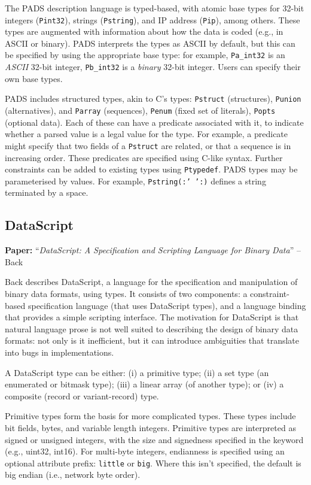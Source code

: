 \documentclass[10pt]{article}
\newcommand{\paper}[3]{\vspace{4mm}\noindent\textbf{Paper:} ``\textit{#1}'' -- #2 \cite{#3}\vspace{3mm}}
\begin{document}
The PADS description language is typed-based, with atomic base types for 32-bit integers
(\texttt{Pint32}), strings (\texttt{Pstring}), and IP address (\texttt{Pip}), among
others. These types are augmented with information about how the data is coded (e.g., in
ASCII or binary). PADS interprets the types as ASCII by default, but this can be specified
by using the appropriate base type: for example, \texttt{Pa\_int32} is an \emph{ASCII}
32-bit integer, \texttt{Pb\_int32} is a \emph{binary} 32-bit integer. Users can specify
their own base types.

PADS includes structured types, akin to C's types: \texttt{Pstruct} (structures),
\texttt{Punion} (alternatives), and \texttt{Parray} (sequences), \texttt{Penum} (fixed set
of literals), \texttt{Popts} (optional data). Each of these can have a predicate
associated with it, to indicate whether a parsed value is a legal value for the type. For
example, a predicate might specify that two fields of a \texttt{Pstruct} are related, or
that a sequence is in increasing order. These predicates are specified using C-like
syntax. Further constraints can be added to existing types using \texttt{Ptypedef}. PADS
types may be parameterised by values. For example, \texttt{Pstring(:' ':)} defines a
string terminated by a space. 

\subsection{DataScript}
\paper{DataScript: A Specification and Scripting Language for Binary Data}{Back}{back2002datascript}

Back describes DataScript, a language for the specification and manipulation of binary
data formats, using types. It consists of two components: a constraint-based specification
language (that uses DataScript types), and a language binding that provides a simple
scripting interface. The motivation for DataScript is that natural language prose is not
well suited to describing the design of binary data formats: not only is it inefficient,
but it can introduce ambiguities that translate into bugs in implementations. 

A DataScript type can be either: (i) a primitive type; (ii) a set type (an enumerated
or bitmask type); (iii) a linear array (of another type); or (iv) a composite (record or
variant-record) type.

Primitive types form the basis for more complicated types. These types include bit fields,
bytes, and variable length integers. Primitive types are interpreted as signed or unsigned
integers, with the size and signedness specified in the keyword (e.g., uint32, int16). For 
multi-byte integers, endianness is specified using an optional attribute prefix:
\texttt{little} or \texttt{big}. Where this isn't specified, the default is big endian 
(i.e., network byte order).
\end{document}

